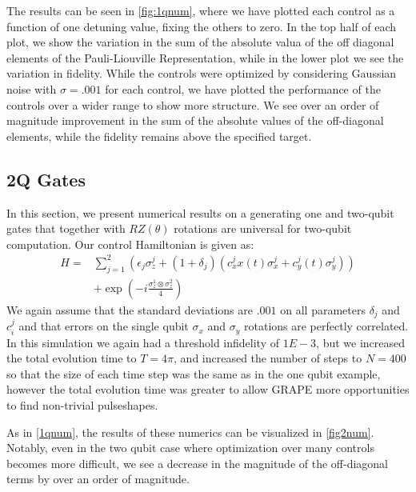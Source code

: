 \documentclass[aps,nofootinbib,pra,notitlepage,twocolumn]{revtex4-1}
\begin{document}
The results can be seen in \ref{fig:1qnum}, where we have plotted each control as a function of one detuning value, fixing the others to zero. In the top half of each plot, we show the variation in the sum of the absolute valua of the off diagonal elements of the Pauli-Liouville Representation, while in the lower plot we see the variation in fidelity. While the controls were optimized by considering Gaussian noise with $\sigma=.001$ for each control, we have plotted the performance of the controls over a wider range to show more structure. We see over an order of magnitude improvement in the sum of the absolute values of the off-diagonal elements, while the fidelity remains above the specified target.



\subsection{2Q Gates}\label{2Q Gates}
 In this section, we present numerical results on a generating one and two-qubit gates that together with $RZ(\theta)$ rotations are universal for two-qubit computation. Our control Hamiltonian is given as:
\begin{equation} \label{eq:2Qham}
\begin{split}
H = &\sum_{j=1}^2(\epsilon_j\sigma_z^j + (1 + \delta_j)(c_x^jx(t)\sigma_x^j + c_y^j(t)\sigma_y^j)) \\
&+ \exp{(-i\frac{\sigma_z^1\otimes\sigma_z^2}{4})}
\end{split}
\end{equation}
We again assume that the standard deviations are $.001$ on all parameters $\delta_j$ and $c^j_i$ and that errors on the single qubit $\sigma_x$ and $\sigma_y$ rotations are perfectly correlated. In this simulation we again had a threshold infidelity of $1E-3$, but we increased the total evolution time to $T=4\pi$, and increased the number of steps to $N=400$ so that the size of each time step was the same as in the one qubit example, however the total evolution time was greater to allow GRAPE more opportunities to find non-trivial pulseshapes.

As in \ref{1qnum}, the results of these numerics can be visualized in \ref{fig2num}. Notably, even in the two qubit case where optimization over many controls becomes more difficult, we see a decrease in the magnitude of the off-diagonal terms by over an order of magnitude.
\end{document}
